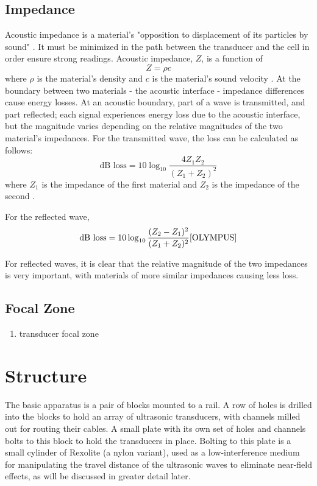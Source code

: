 \subsection{Impedance}
Acoustic impedance is a material's "opposition to displacement of its particles by sound" \cite{OLYMPUS}. It must be minimized in the path between the transducer and the cell in order ensure strong readings. Acoustic impedance, $Z$, is a function of
$$ Z = \rho c$$
where $\rho$ is the material's density and $c$ is the material's sound velocity \cite{OLYMPUS}.
At the boundary between two materials - the acoustic interface - impedance differences cause energy losses. At an acoustic boundary, part of a wave is transmitted, and part reflected; each signal experiences energy loss due to the acoustic interface, but the magnitude varies depending on the relative magnitudes of the two material's impedances.
For the transmitted wave, the loss can be calculated as follows:
$$ \text{dB loss} = 10 \log_{10} \frac{4Z_1 Z_2}{(Z_1 + Z_2)^2}$$
where $Z_1$ is the impedance of the first material and $Z_2$ is the impedance of the second \cite{OLYMPUS}.

For the reflected wave, 
$$\text{dB loss} = 10\log_{10} \frac{(Z_2 - Z_1)^2}{(Z_1 + Z_2)^2} \cite{OLYMPUS}$$

For reflected waves, it is clear that the relative magnitude of the two impedances is very important, with materials of more similar impedances causing less loss.

\subsection{Focal Zone}
		\begin{enumerate} 
	        \item transducer focal zone
	    \end{enumerate}


\section{Structure}

The basic apparatus is a pair of blocks mounted to a rail. A row of holes is drilled into the blocks to hold an array of ultrasonic transducers, with channels milled out for routing their cables. A small plate with its own set of holes and channels bolts to this block to hold the transducers in place. Bolting to this plate is a small cylinder of Rexolite (a nylon variant), used as a low-interference medium for manipulating the travel distance of the ultrasonic waves to eliminate near-field effects, as will be discussed in greater detail later.


